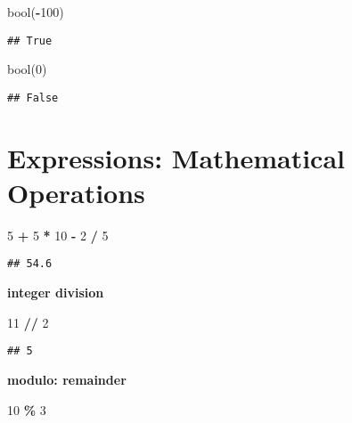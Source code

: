 \documentclass[
]{book}
\newenvironment{Shaded}{\begin{snugshade}}{\end{snugshade}}
\newcommand{\BuiltInTok}[1]{#1}
\newcommand{\DecValTok}[1]{\textcolor[rgb]{0.00,0.00,0.81}{#1}}
\newcommand{\NormalTok}[1]{#1}
\newcommand{\OperatorTok}[1]{\textcolor[rgb]{0.81,0.36,0.00}{\textbf{#1}}}
\begin{document}
\begin{Shaded}
\begin{Highlighting}[]
\BuiltInTok{bool}\NormalTok{(}\OperatorTok{{-}}\DecValTok{100}\NormalTok{)}
\end{Highlighting}
\end{Shaded}

\begin{verbatim}
## True
\end{verbatim}

\begin{Shaded}
\begin{Highlighting}[]
\BuiltInTok{bool}\NormalTok{(}\DecValTok{0}\NormalTok{)}
\end{Highlighting}
\end{Shaded}

\begin{verbatim}
## False
\end{verbatim}

\hypertarget{expressions-mathematical-operations}{%
\section{Expressions: Mathematical Operations}\label{expressions-mathematical-operations}}

\begin{Shaded}
\begin{Highlighting}[]
\DecValTok{5} \OperatorTok{+} \DecValTok{5} \OperatorTok{*} \DecValTok{10}  \OperatorTok{{-}} \DecValTok{2} \OperatorTok{/} \DecValTok{5}
\end{Highlighting}
\end{Shaded}

\begin{verbatim}
## 54.6
\end{verbatim}

\textbf{integer division}

\begin{Shaded}
\begin{Highlighting}[]
\DecValTok{11} \OperatorTok{//} \DecValTok{2}   
\end{Highlighting}
\end{Shaded}

\begin{verbatim}
## 5
\end{verbatim}

\textbf{modulo: remainder}

\begin{Shaded}
\begin{Highlighting}[]
\DecValTok{10} \OperatorTok{\%} \DecValTok{3}   
\end{Highlighting}
\end{Shaded}
\end{document}
